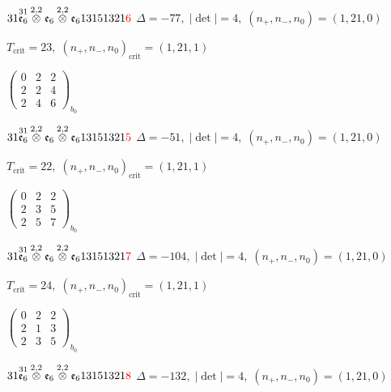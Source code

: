 \documentclass[10pt]{article}
\begin{document}
\smallskip

$31\overset{31}{\mathfrak{e}_6}\overset{2,2}{\otimes}\mathfrak{e}_6\overset{2,2}{\otimes}\mathfrak{e}_613151321\textcolor{red}{6}$ \quad $\Delta=-77,\; |\det|=4,\; (n_+,n_-,n_0)=(1,21,0)$

\hspace{1em}$T_{\text{crit}}=23,\; (n_+,n_-,n_0)_{\text{crit}}=(1,21,1)$

\hspace{2em}$\left(\begin{smallmatrix}0 & 2 & 2 \\ 2 & 2 & 4 \\ 2 & 4 & 6\end{smallmatrix}\right)_{\!b_0}$

$31\overset{31}{\mathfrak{e}_6}\overset{2,2}{\otimes}\mathfrak{e}_6\overset{2,2}{\otimes}\mathfrak{e}_613151321\textcolor{red}{5}$ \quad $\Delta=-51,\; |\det|=4,\; (n_+,n_-,n_0)=(1,21,0)$

\hspace{1em}$T_{\text{crit}}=22,\; (n_+,n_-,n_0)_{\text{crit}}=(1,21,1)$

\hspace{2em}$\left(\begin{smallmatrix}0 & 2 & 2 \\ 2 & 3 & 5 \\ 2 & 5 & 7\end{smallmatrix}\right)_{\!b_0}$

$31\overset{31}{\mathfrak{e}_6}\overset{2,2}{\otimes}\mathfrak{e}_6\overset{2,2}{\otimes}\mathfrak{e}_613151321\textcolor{red}{7}$ \quad $\Delta=-104,\; |\det|=4,\; (n_+,n_-,n_0)=(1,21,0)$

\hspace{1em}$T_{\text{crit}}=24,\; (n_+,n_-,n_0)_{\text{crit}}=(1,21,1)$

\hspace{2em}$\left(\begin{smallmatrix}0 & 2 & 2 \\ 2 & 1 & 3 \\ 2 & 3 & 5\end{smallmatrix}\right)_{\!b_0}$

$31\overset{31}{\mathfrak{e}_6}\overset{2,2}{\otimes}\mathfrak{e}_6\overset{2,2}{\otimes}\mathfrak{e}_613151321\textcolor{red}{8}$ \quad $\Delta=-132,\; |\det|=4,\; (n_+,n_-,n_0)=(1,21,0)$
\end{document}
